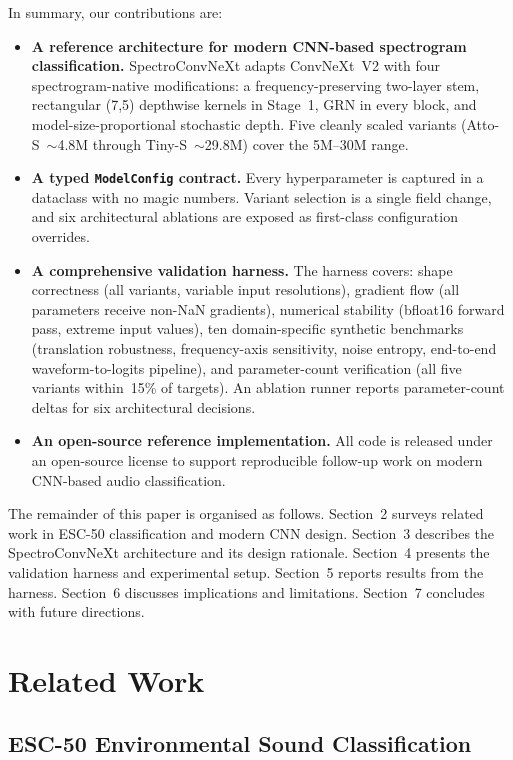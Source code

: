 \documentclass{article}
\begin{document}
In summary, our contributions are:
\begin{itemize}
  \item \textbf{A reference architecture for modern CNN-based spectrogram
  classification.} SpectroConvNeXt adapts ConvNeXt~V2 with four spectrogram-native
  modifications: a frequency-preserving two-layer stem, rectangular (7,5)
  depthwise kernels in Stage~1, GRN in every block, and
  model-size-proportional stochastic depth. Five cleanly scaled variants
  (Atto-S~$\sim$4.8M through Tiny-S~$\sim$29.8M) cover the 5M--30M range.
  \item \textbf{A typed \texttt{ModelConfig} contract.} Every hyperparameter is
  captured in a dataclass with no magic numbers. Variant selection is a single
  field change, and six architectural ablations are exposed as first-class
  configuration overrides.
  \item \textbf{A comprehensive validation harness.} The harness covers: shape
  correctness (all variants, variable input resolutions), gradient flow
  (all parameters receive non-NaN gradients), numerical stability (bfloat16
  forward pass, extreme input values), ten domain-specific synthetic
  benchmarks (translation robustness, frequency-axis sensitivity, noise
  entropy, end-to-end waveform-to-logits pipeline), and parameter-count
  verification (all five variants within~15\% of targets). An ablation runner
  reports parameter-count deltas for six architectural decisions.
  \item \textbf{An open-source reference implementation.} All code is released
  under an open-source license to support reproducible follow-up work on
  modern CNN-based audio classification.
\end{itemize}

The remainder of this paper is organised as follows. Section~2 surveys related
work in ESC-50 classification and modern CNN design. Section~3 describes the
SpectroConvNeXt architecture and its design rationale. Section~4 presents the
validation harness and experimental setup. Section~5 reports results from the
harness. Section~6 discusses implications and limitations. Section~7 concludes
with future directions.

\section{Related Work}

\subsection{ESC-50 Environmental Sound Classification}
\end{document}
